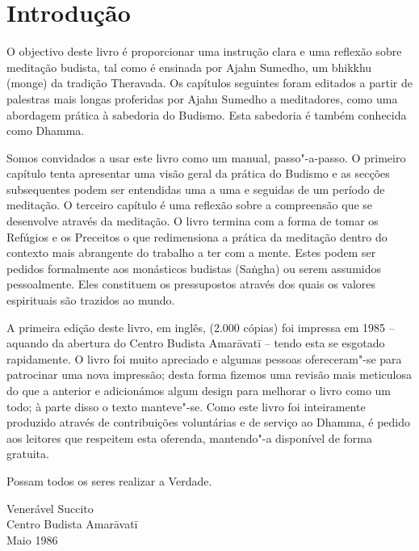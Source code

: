 \chapter{Introdução}

O objectivo deste livro é proporcionar uma instrução clara e uma
reflexão sobre meditação budista, tal como é ensinada por Ajahn Sumedho,
um bhikkhu (monge) da tradição Theravada. Os capítulos seguintes foram
editados a partir de palestras mais longas proferidas por Ajahn Sumedho
a meditadores, como uma abordagem prática à sabedoria do Budismo. Esta
sabedoria é também conhecida como Dhamma.

Somos convidados a usar este livro como um manual, passo"-a-passo.
O primeiro capítulo tenta apresentar uma visão geral da
prática do Budismo e as secções subsequentes podem ser entendidas uma a
uma e seguidas de um período de meditação. O terceiro capítulo é uma
reflexão sobre a compreensão que se desenvolve através da meditação. O
livro termina com a forma de tomar os Refúgios e os Preceitos o que
redimensiona a prática da meditação dentro do contexto mais abrangente
do trabalho a ter com a mente. Estes podem ser pedidos formalmente aos
monásticos budistas (Saṅgha) ou serem assumidos pessoalmente. Eles
constituem os pressupostos através dos quais os valores espirituais são
trazidos ao mundo.

A primeira edição deste livro, em inglês, (2.000 cópias) foi impressa em
1985 -- aquando da abertura do Centro Budista Amarāvatī -- tendo esta se
esgotado rapidamente. O livro foi muito apreciado e algumas pessoas
ofereceram"-se para patrocinar uma nova impressão; desta forma fizemos
uma revisão mais meticulosa do que a anterior e adicionámos algum
design para melhorar o livro como um todo; à parte disso o texto
manteve"-se. Como este livro foi inteiramente produzido através de
contribuições voluntárias e de serviço ao Dhamma, é pedido aos leitores
que respeitem esta oferenda, mantendo"-a disponível de forma gratuita.

Possam todos os seres realizar a Verdade.

\bigskip

{\raggedleft
Venerável Succito\\
Centro Budista Amarāvatī\\
Maio 1986
\par}


